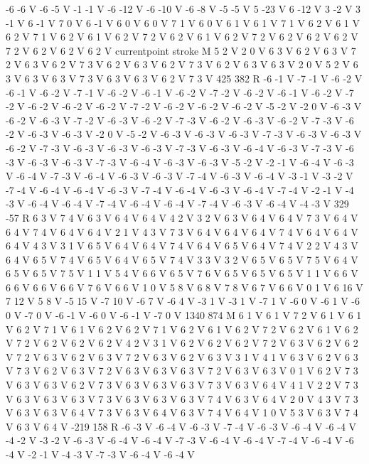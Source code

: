 {-6 -6 V
-6 -5 V
-1 -1 V
-6 -12 V
-6 -10 V
-6 -8 V
-5 -5 V
5 -23 V
6 -12 V
3 -2 V
3 -1 V
6 -1 V
7 0 V
6 -1 V
6 0 V
6 0 V
7 1 V
6 0 V
6 1 V
6 1 V
7 1 V
6 2 V
6 1 V
6 2 V
7 1 V
6 2 V
6 1 V
6 2 V
7 2 V
6 2 V
6 1 V
6 2 V
7 2 V
6 2 V
6 2 V
6 2 V
7 2 V
6 2 V
6 2 V
6 2 V
currentpoint stroke M
5 2 V
2 0 V
6 3 V
6 2 V
6 3 V
7 2 V
6 3 V
6 2 V
7 3 V
6 2 V
6 3 V
6 2 V
7 3 V
6 2 V
6 3 V
6 3 V
2 0 V
5 2 V
6 3 V
6 3 V
6 3 V
7 3 V
6 3 V
6 3 V
6 2 V
7 3 V
425 382 R
-6 -1 V
-7 -1 V
-6 -2 V
-6 -1 V
-6 -2 V
-7 -1 V
-6 -2 V
-6 -1 V
-6 -2 V
-7 -2 V
-6 -2 V
-6 -1 V
-6 -2 V
-7 -2 V
-6 -2 V
-6 -2 V
-6 -2 V
-7 -2 V
-6 -2 V
-6 -2 V
-6 -2 V
-5 -2 V
-2 0 V
-6 -3 V
-6 -2 V
-6 -3 V
-7 -2 V
-6 -3 V
-6 -2 V
-7 -3 V
-6 -2 V
-6 -3 V
-6 -2 V
-7 -3 V
-6 -2 V
-6 -3 V
-6 -3 V
-2 0 V
-5 -2 V
-6 -3 V
-6 -3 V
-6 -3 V
-7 -3 V
-6 -3 V
-6 -3 V
-6 -2 V
-7 -3 V
-6 -3 V
-6 -3 V
-6 -3 V
-7 -3 V
-6 -3 V
-6 -4 V
-6 -3 V
-7 -3 V
-6 -3 V
-6 -3 V
-6 -3 V
-7 -3 V
-6 -4 V
-6 -3 V
-6 -3 V
-5 -2 V
-2 -1 V
-6 -4 V
-6 -3 V
-6 -4 V
-7 -3 V
-6 -4 V
-6 -3 V
-6 -3 V
-7 -4 V
-6 -3 V
-6 -4 V
-3 -1 V
-3 -2 V
-7 -4 V
-6 -4 V
-6 -4 V
-6 -3 V
-7 -4 V
-6 -4 V
-6 -3 V
-6 -4 V
-7 -4 V
-2 -1 V
-4 -3 V
-6 -4 V
-6 -4 V
-7 -4 V
-6 -4 V
-6 -4 V
-7 -4 V
-6 -3 V
-6 -4 V
-4 -3 V
329 -57 R
6 3 V
7 4 V
6 3 V
6 4 V
6 4 V
4 2 V
3 2 V
6 3 V
6 4 V
6 4 V
7 3 V
6 4 V
6 4 V
7 4 V
6 4 V
6 4 V
2 1 V
4 3 V
7 3 V
6 4 V
6 4 V
6 4 V
7 4 V
6 4 V
6 4 V
6 4 V
4 3 V
3 1 V
6 5 V
6 4 V
6 4 V
7 4 V
6 4 V
6 5 V
6 4 V
7 4 V
2 2 V
4 3 V
6 4 V
6 5 V
7 4 V
6 5 V
6 4 V
6 5 V
7 4 V
3 3 V
3 2 V
6 5 V
6 5 V
7 5 V
6 4 V
6 5 V
6 5 V
7 5 V
1 1 V
5 4 V
6 6 V
6 5 V
7 6 V
6 5 V
6 5 V
6 5 V
1 1 V
6 6 V
6 6 V
6 6 V
6 6 V
7 6 V
6 6 V
1 0 V
5 8 V
6 8 V
7 8 V
6 7 V
6 6 V
0 1 V
6 16 V
7 12 V
5 8 V
-5 15 V
-7 10 V
-6 7 V
-6 4 V
-3 1 V
-3 1 V
-7 1 V
-6 0 V
-6 1 V
-6 0 V
-7 0 V
-6 -1 V
-6 0 V
-6 -1 V
-7 0 V
1340 874 M
6 1 V
6 1 V
7 2 V
6 1 V
6 1 V
6 2 V
7 1 V
6 1 V
6 2 V
6 2 V
7 1 V
6 2 V
6 1 V
6 2 V
7 2 V
6 2 V
6 1 V
6 2 V
7 2 V
6 2 V
6 2 V
6 2 V
4 2 V
3 1 V
6 2 V
6 2 V
6 2 V
7 2 V
6 3 V
6 2 V
6 2 V
7 2 V
6 3 V
6 2 V
6 3 V
7 2 V
6 3 V
6 2 V
6 3 V
3 1 V
4 1 V
6 3 V
6 2 V
6 3 V
7 3 V
6 2 V
6 3 V
7 2 V
6 3 V
6 3 V
6 3 V
7 2 V
6 3 V
6 3 V
0 1 V
6 2 V
7 3 V
6 3 V
6 3 V
6 2 V
7 3 V
6 3 V
6 3 V
6 3 V
7 3 V
6 3 V
6 4 V
4 1 V
2 2 V
7 3 V
6 3 V
6 3 V
6 3 V
7 3 V
6 3 V
6 3 V
6 3 V
7 4 V
6 3 V
6 4 V
2 0 V
4 3 V
7 3 V
6 3 V
6 3 V
6 4 V
7 3 V
6 3 V
6 4 V
6 3 V
7 4 V
6 4 V
1 0 V
5 3 V
6 3 V
7 4 V
6 3 V
6 4 V
-219 158 R
-6 -3 V
-6 -4 V
-6 -3 V
-7 -4 V
-6 -3 V
-6 -4 V
-6 -4 V
-4 -2 V
-3 -2 V
-6 -3 V
-6 -4 V
-6 -4 V
-7 -3 V
-6 -4 V
-6 -4 V
-7 -4 V
-6 -4 V
-6 -4 V
-2 -1 V
-4 -3 V
-7 -3 V
-6 -4 V
-6 -4 V
}
